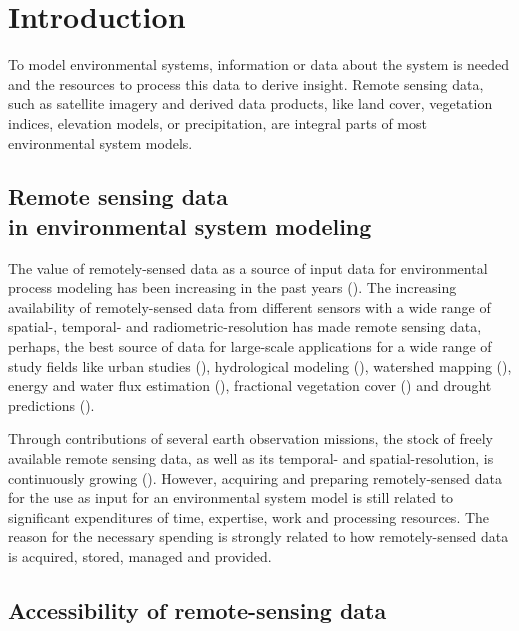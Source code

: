 \chapter{Introduction}


To model environmental systems, information or data about the system is needed and the resources to process this data to derive insight. Remote sensing data, such as satellite imagery and derived data products, like land cover, vegetation indices, elevation models, or precipitation, are integral parts of most environmental system models. 

\section{Remote sensing data \\ in environmental system modeling}

The value of remotely-sensed data as a source of input data for environmental process modeling has been increasing in the past years (\cite{melesse2007remote}). The increasing availability of remotely-sensed data from different sensors with a wide range of spatial-, temporal- and radiometric-resolution has made remote sensing data, perhaps, the best source of data for large-scale applications for a wide range of study fields like urban studies (\cite{wu2000global}), hydrological modeling (\cite{bogh2004incorporating}), watershed mapping (\cite{melesse2003spatially}), energy and water flux estimation (\cite{melesse2005estimation}), fractional vegetation cover (\cite{carlson2000impact}) and drought predictions (\cite{rhee2010monitoring}).

Through contributions of several earth observation missions, the stock of freely available remote sensing data, as well as its temporal- and spatial-resolution, is continuously growing (\cite{melesse2007remote}).
However, acquiring and preparing remotely-sensed data for the use as input for an environmental system model is still related to significant expenditures of time, expertise, work and processing resources. The reason for the necessary spending is strongly related to how remotely-sensed data is acquired, stored, managed and provided.

\section{Accessibility of remote-sensing data}

